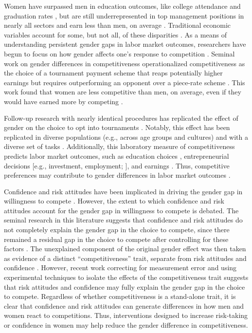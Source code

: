 \documentclass[a4paper, nobind]{templates/ociamthesis}
\begin{document}
\minitoc 

Women have surpassed men in education outcomes, like college attendance and graduation rates \autocite{Blau2017,Goldin2006,Stoet2014}, but are still underrepresented in top management positions in nearly all sectors \autocite{Bertrand2001} and earn less than men, on average \autocite{Blau2017}. Traditional economic variables account for some, but not all, of these disparities \autocite{Blau2017}. As a means of understanding persistent gender gaps in labor market outcomes, researchers have begun to focus on how gender affects one's response to competition \autocite[for review, see][]{Niederle2011}. Seminal work on gender differences in competitiveness operationalized competitiveness as the choice of a tournament payment scheme that reaps potentially higher earnings but requires outperforming an opponent over a piece-rate scheme \autocite{Niederle2007}. This work found that women are less competitive than men, on average, even if they would have earned more by competing \autocite{Niederle2007}.

Follow-up research with nearly identical procedures has replicated the effect of gender on the choice to opt into tournaments \autocite[see][ for review]{Niederle2011}. Notably, this effect has been replicated in diverse populations (e.g., across age groups and cultures) \autocite{Apicella2015,Buser2014,Sutter2016,Andersen2013,Buser2017b,Sutter2010,Dreber2014,Mayr2012} and with a diverse set of tasks \autocite{Apicella2015,Saccardo2018,Bjorvatn2016,Sutter2015,Frick2011,Samek2019}. Additionally, this laboratory measure of competitiveness predicts labor market outcomes, such as education choices \autocite{Buser2014,Zhang2012}, entrepreneurial decisions {[}e.g., investment, employment; \textcite{Berge2015}{]}, and earnings \autocite{Reuben2015}. Thus, competitive preferences may contribute to gender differences in labor market outcomes \autocite{Blau2017}.

Confidence and risk attitudes have been implicated in driving the gender gap in willingness to compete \autocite{Niederle2011,Veldhuizen2017}. However, the extent to which confidence and risk attitudes account for the gender gap in willingness to compete is debated. The seminal research in this literature suggests that confidence and risk attitudes do not completely explain the gender gap in the choice to compete, since there remained a residual gap in the choice to compete after controlling for these factors \autocite{Niederle2007}. The unexplained component of the original gender effect was then taken as evidence of a distinct ``competitiveness'' trait, separate from risk attitudes and confidence \autocite{Niederle2007,Niederle2011}. However, recent work correcting for measurement error \autocite{Gillen2019} and using experimental techniques to isolate the effects of the competitiveness trait \autocite{Veldhuizen2017} suggests that risk attitudes and confidence may fully explain the gender gap in the choice to compete. Regardless of whether competitiveness is a stand-alone trait, it is clear that confidence and risk attitudes can generate differences in how men and women react to competitions. Thus, interventions designed to increase risk-taking or confidence in women may help reduce the gender difference in competitiveness.
\end{document}
